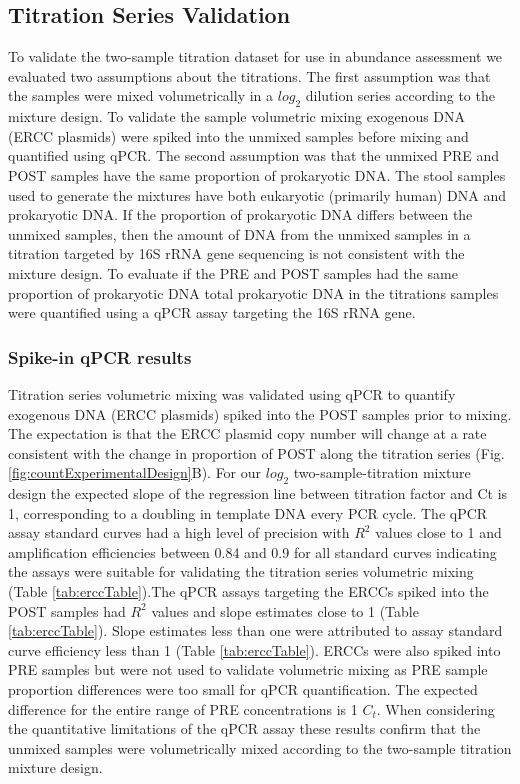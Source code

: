 \subsection*{Titration Series Validation}

To validate the two-sample titration dataset for use in abundance
assessment we evaluated two assumptions about the titrations. The first assumption was that the 
samples were mixed volumetrically in a \(log_2\) dilution series
according to the mixture design. To validate the sample volumetric mixing exogenous
DNA (ERCC plasmids) were spiked into the unmixed samples before mixing and quantified
using qPCR. The second assumption was that the unmixed PRE and POST samples
have the same proportion of prokaryotic DNA. The stool samples used to
generate the mixtures have both eukaryotic (primarily human) DNA and
prokaryotic DNA. If the proportion of prokaryotic DNA differs between
the unmixed samples, then the amount of DNA from the unmixed samples in
a titration targeted by 16S rRNA gene sequencing is not consistent with
the mixture design. To evaluate if the PRE and POST samples had the same
proportion of prokaryotic DNA total prokaryotic DNA in the titrations
samples were quantified using a qPCR assay targeting the 16S rRNA gene.


\subsubsection*{Spike-in qPCR results}

Titration series volumetric mixing was validated using qPCR to quantify exogenous
DNA (ERCC plasmids) spiked into the POST samples prior to mixing. 
The expectation is that the ERCC plasmid copy number will change at a rate consistent 
with the change in proportion of POST along  the titration series (Fig. \ref{fig:countExperimentalDesign}B). 
For our \(log_2\) two-sample-titration mixture design the expected slope of the
regression line between titration factor and Ct is 1, corresponding to a
doubling in template DNA every PCR cycle. The qPCR assay
standard curves had a high level of precision with \(R^2\) values close
to 1 and amplification efficiencies between 0.84 and 0.9 for all
standard curves indicating the assays were suitable for validating the
titration series volumetric mixing (Table \ref{tab:erccTable}).The qPCR assays targeting the
ERCCs spiked into the POST samples had \(R^2\) values and slope
estimates close to 1 (Table \ref{tab:erccTable}). Slope estimates less
than one were attributed to assay standard curve efficiency less than 1
(Table \ref{tab:erccTable}). ERCCs were also spiked into PRE samples but were not used
to validate volumetric mixing as PRE sample proportion differences were
too small for qPCR quantification. The expected difference for
the entire range of PRE concentrations is 1 \(C_t\). When considering the
quantitative limitations of the qPCR assay these results confirm that
the unmixed samples were volumetrically mixed according to the
two-sample titration mixture design.

